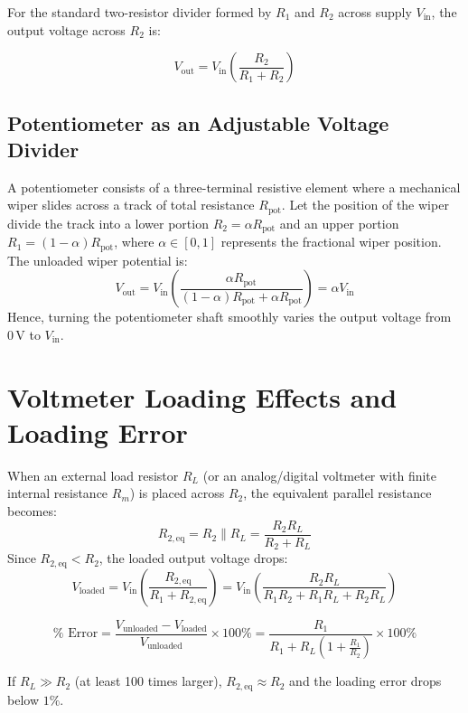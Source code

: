 For the standard two-resistor divider formed by $R_1$ and $R_2$ across supply $V_{\mathrm{in}}$, the output voltage across $R_2$ is:
\begin{keyequation}
\[ V_{\mathrm{out}} = V_{\mathrm{in}} \left( \frac{R_2}{R_1 + R_2} \right) \]
\end{keyequation}

\subsection{Potentiometer as an Adjustable Voltage Divider}
A potentiometer consists of a three-terminal resistive element where a mechanical wiper slides across a track of total resistance $R_{\mathrm{pot}}$.
Let the position of the wiper divide the track into a lower portion $R_2 = \alpha R_{\mathrm{pot}}$ and an upper portion $R_1 = (1 - \alpha) R_{\mathrm{pot}}$, where $\alpha \in [0, 1]$ represents the fractional wiper position. The unloaded wiper potential is:
\[ V_{\mathrm{out}} = V_{\mathrm{in}} \left( \frac{\alpha R_{\mathrm{pot}}}{(1 - \alpha) R_{\mathrm{pot}} + \alpha R_{\mathrm{pot}}} \right) = \alpha V_{\mathrm{in}} \]
Hence, turning the potentiometer shaft smoothly varies the output voltage from $0\,\mathrm{V}$ to $V_{\mathrm{in}}$.

\section{Voltmeter Loading Effects and Loading Error}
When an external load resistor $R_L$ (or an analog/digital voltmeter with finite internal resistance $R_m$) is placed across $R_2$, the equivalent parallel resistance becomes:
\[ R_{2,\mathrm{eq}} = R_2 \parallel R_L = \frac{R_2 R_L}{R_2 + R_L} \]
Since $R_{2,\mathrm{eq}} < R_2$, the loaded output voltage drops:
\[ V_{\mathrm{loaded}} = V_{\mathrm{in}} \left( \frac{R_{2,\mathrm{eq}}}{R_1 + R_{2,\mathrm{eq}}} \right) = V_{\mathrm{in}} \left( \frac{R_2 R_L}{R_1 R_2 + R_1 R_L + R_2 R_L} \right) \]

\begin{keyequation}
\[ \%\text{ Error} = \frac{V_{\mathrm{unloaded}} - V_{\mathrm{loaded}}}{V_{\mathrm{unloaded}}} \times 100\% = \frac{R_1}{R_1 + R_L \left(1 + \frac{R_1}{R_2}\right)} \times 100\% \]
\end{keyequation}
If $R_L \gg R_2$ (at least 100 times larger), $R_{2,\mathrm{eq}} \approx R_2$ and the loading error drops below $1\%$.

